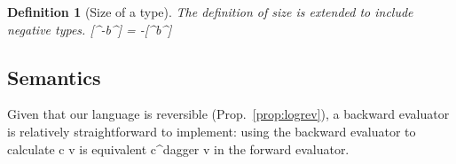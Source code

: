 \documentclass[preprint]{sigplanconf}
\newtheorem{definition}[theorem]{Definition}
\begin{document}
\begin{definition}[Size of a type]
The definition of size is extended to include negative types.
{{[^-b^] = -[^b^]}}
\end{definition}

\subsection{Semantics}

Given that our language is reversible (Prop.~\ref{prop:logrev}), a backward
evaluator is relatively straightforward to implement: using the backward
evaluator to calculate {{c v}} is equivalent {{c^{dagger} v}} in the forward
evaluator.

\end{document}
